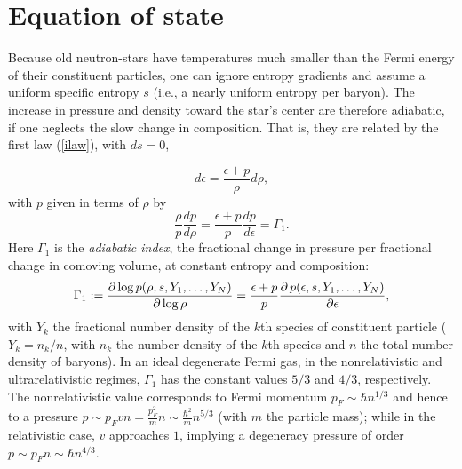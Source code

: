 \documentclass[12pt]{article}
\def\ep{\epsilon}
\def\be{\begin{equation}}
\def\ee{\end{equation}}
\newcommand{\pa}{\partial}
\begin{document}
\section{Equation of state}

%
Because old neutron-stars have temperatures much
smaller than the Fermi energy of their constituent particles, one
can ignore entropy gradients and assume a uniform specific entropy 
$s$ (i.e., a nearly uniform entropy per baryon). The increase in 
pressure and density toward the star's center
are therefore adiabatic, if one neglects the slow change in
composition. That is, they are related by the first law (\ref{ilaw}),
with $ds=0$,

\be 
d\epsilon = \frac{\epsilon+p}{\rho} d\rho, 
\label{eq:dedrho}\ee
with $p$ given in terms of $\rho$ by 
\be 
 \frac\rho p \frac{dp}{d\rho}  = \frac{\epsilon+p}{p}\frac{dp}{d \epsilon} 
= \Gamma_1.
\label{eq:dpdrho}\ee
{}
Here $\Gamma_1$ is the {\it adiabatic index}, the fractional  
change in pressure per fractional change in comoving volume, at 
constant entropy and composition:
\be
\Gamma_1 := {\pa\log p(\rho,s,Y_1,\ldots,Y_N)\over{\pa\log \rho}} 
        = {\ep +p\over p} {\pa\, p(\ep,s,Y_1,\ldots,Y_N)\over{\pa\ep}},  
\label{thel}
\ee
with $Y_k$ the fractional number density of the $k$th species of constituent 
particle ($Y_k = n_k/n$, with $n_k$ the number density of the $k$th species 
and $n$ the total number density of baryons).  
In an ideal degenerate Fermi gas, in the nonrelativistic and 
ultrarelativistic regimes, $\Gamma_1$ has the constant 
values $5/3$ and $4/3$, respectively.  The nonrelativistic value 
corresponds to Fermi momentum $p_F\sim \hbar n^{1/3}$ and hence to a pressure 
$\displaystyle p\sim p_F v n=\frac{p_F^2}{m} n 
        \sim \frac{\hbar^2}{m}n^{5/3}$ (with $m$ the particle mass); while in the 
relativistic case, $v$ approaches $1$, implying a degeneracy pressure 
of order $\displaystyle p\sim p_F n \sim \hbar n^{4/3}$.
 
\end{document}
